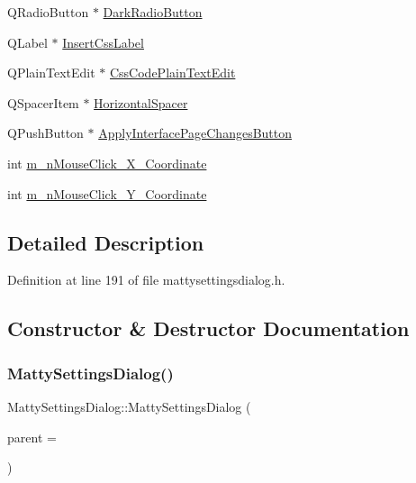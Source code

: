 \begin{DoxyCompactItemize}
Q\+Radio\+Button $\ast$ \hyperlink{classMattySettingsDialog_a118d63e6468ca5d5b2bbb68241e3bae5}{Dark\+Radio\+Button}
\item 
Q\+Label $\ast$ \hyperlink{classMattySettingsDialog_aed8d05ed2c013c77b15b0a22d0a3b604}{Insert\+Css\+Label}
\item 
Q\+Plain\+Text\+Edit $\ast$ \hyperlink{classMattySettingsDialog_a9e655435f2bcca518d5a9b8ae6244257}{Css\+Code\+Plain\+Text\+Edit}
\item 
Q\+Spacer\+Item $\ast$ \hyperlink{classMattySettingsDialog_a83bd6a20a2ce05082e4258c82d8a82cb}{Horizontal\+Spacer}
\item 
Q\+Push\+Button $\ast$ \hyperlink{classMattySettingsDialog_aacdb8eada43f929ba854e06a6311f714}{Apply\+Interface\+Page\+Changes\+Button}
\item 
int \hyperlink{classMattySettingsDialog_a0a19e3bafbfb97c643edfa372dd01795}{m\+\_\+n\+Mouse\+Click\+\_\+\+X\+\_\+\+Coordinate}
\item 
int \hyperlink{classMattySettingsDialog_a7e437ff929a372a8a9bccdb8d3463b10}{m\+\_\+n\+Mouse\+Click\+\_\+\+Y\+\_\+\+Coordinate}
\end{DoxyCompactItemize}


\subsection{Detailed Description}


Definition at line 191 of file mattysettingsdialog.\+h.



\subsection{Constructor \& Destructor Documentation}
\hypertarget{classMattySettingsDialog_a609bf8d82968105e72cf497216230451}{}\label{classMattySettingsDialog_a609bf8d82968105e72cf497216230451} 
\subsubsection{\texorpdfstring{Matty\+Settings\+Dialog()}{MattySettingsDialog()}}
{\footnotesize\ttfamily Matty\+Settings\+Dialog\+::\+Matty\+Settings\+Dialog (\begin{DoxyParamCaption}\item[{Q\+Widget $\ast$}]{parent = {} }\end{DoxyParamCaption})}



